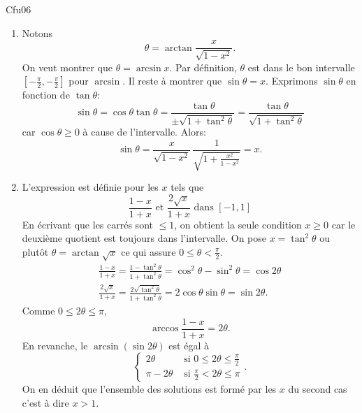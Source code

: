 \begin{tiny}Cfu06\end{tiny} 
\begin{enumerate}
  \item Notons
\[
  \theta = \arctan \frac{x}{\sqrt{1-x^2}}.
\]
On veut montrer que $\theta = \arcsin x$.\newline
Par définition, $\theta$ est dans le bon intervalle $\left[ -\frac{\pi}{2}, -\frac{\pi}{2}\right]$ pour $\arcsin$. Il reste à montrer que $\sin \theta = x$.\newline
Exprimons $\sin \theta$ en fonction de $\tan \theta$:
\[
  \sin \theta = \cos \theta \tan \theta 
  = \frac{\tan \theta}{\pm \sqrt{1+ \tan^2 \theta}}
  = \frac{\tan \theta}{\sqrt{1+ \tan^2 \theta}}
\]
car $\cos \theta \geq 0$ à cause de l'intervalle. Alors:
\[
  \sin \theta = \frac{x}{\sqrt{1-x^2}}\, \frac{1}{\sqrt{1 + \frac{x^2}{1 - x^2}}}
  = x.
\]
  \item L'expression est définie pour les $x$ tels que
\[
  \frac{1-x}{1+x} \text{ et } \frac{2\sqrt{x}}{1+x} \text{ dans } \left[ -1, 1 \right]
\]
En écrivant que les carrés sont $\leq 1$, on obtient la seule condition $x\geq 0$ car le deuxième quotient est toujours dans l'intervalle.
On pose $x = \tan^2 \theta$ ou plutôt $\theta = \arctan \sqrt{x}$ ce qui assure $0\leq \theta < \frac{\pi}{2}$.
\begin{multline*}
  \frac{1-x}{1+x} = \frac{1-\tan^2 \theta}{1+\tan^2 \theta}
  = \cos ^2 \theta - \sin^2 \theta = \cos 2\theta\\
  \frac{2\sqrt{x}}{1+x} = \frac{2\sqrt{\tan^2 \theta}}{1+\tan^2 \theta}
  = 2\cos \theta \sin \theta = \sin 2\theta.
\end{multline*}
Comme $0 \leq 2\theta \leq \pi$,
\[
  \arccos \frac{1-x}{1+x} = 2\theta.
\]
En revanche, le $\arcsin(\sin 2\theta)$ est égal à
\[
  \left\lbrace
  \begin{aligned}
    2\theta &\text{ si } 0 \leq 2 \theta \leq \frac{\pi}{2} \\
    \pi - 2\theta &\text{ si } \frac{\pi}{2} < 2 \theta \leq \pi
  \end{aligned}
\right. .
\]
On en déduit que l'ensemble des solutions est formé par les $x$ du second cas c'est à dire $x > 1$.
\end{enumerate}

